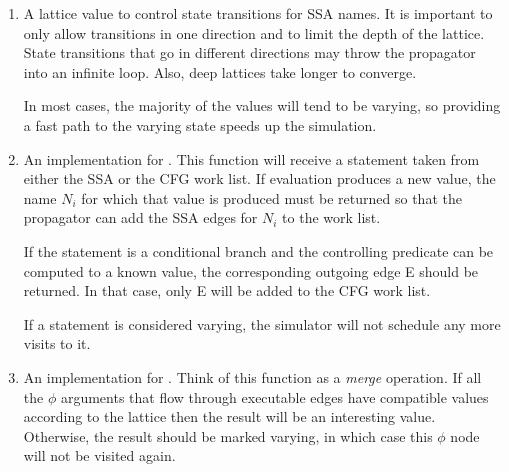 \begin{enumerate}
\item	A lattice value to control state transitions for SSA
	names.  It is important to only allow transitions in one
	direction and to limit the depth of the lattice.  State
	transitions that go in different directions may throw the
	propagator into an infinite loop.  Also, deep lattices
	take longer to converge.

	In most cases, the majority of the values will tend to be
	varying, so providing a fast path to the varying state
	speeds up the simulation.

\item	An implementation for .  This
	function will receive a statement taken from either the
	SSA or the CFG work list.  If evaluation produces a
	new value, the name $N_i$ for which that value is
	produced must be returned so that the propagator can add
	the SSA edges for $N_i$ to the work list.

	If the statement is a conditional branch and the
	controlling predicate can be computed to a known value,
	the corresponding outgoing edge E should be returned.
	In that case, only E will be added to the CFG work list.

	If a statement is considered varying, the simulator will
	not schedule any more visits to it.

\item	An implementation for .  Think
	of this function as a \textit{merge} operation.  If all
	the $\phi$ arguments that flow through executable edges
	have compatible values according to the lattice then the
	result will be an interesting value.  Otherwise, the
	result should be marked varying, in which case this
	$\phi$ node will not be visited again.
\end{enumerate}



